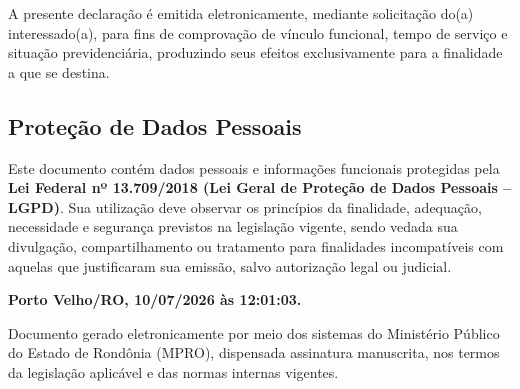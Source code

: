 \documentclass[
]{article}
\begin{document}
A presente declaração é emitida eletronicamente, mediante solicitação
do(a) interessado(a), para fins de comprovação de vínculo funcional,
tempo de serviço e situação previdenciária, produzindo seus efeitos
exclusivamente para a finalidade a que se destina.

\subsection{Proteção de Dados
Pessoais}\label{proteuxe7uxe3o-de-dados-pessoais}

Este documento contém dados pessoais e informações funcionais protegidas
pela \textbf{Lei Federal nº 13.709/2018 (Lei Geral de Proteção de Dados
Pessoais -- LGPD)}. Sua utilização deve observar os princípios da
finalidade, adequação, necessidade e segurança previstos na legislação
vigente, sendo vedada sua divulgação, compartilhamento ou tratamento
para finalidades incompatíveis com aquelas que justificaram sua emissão,
salvo autorização legal ou judicial.

\textbf{Porto Velho/RO, 10/07/2026 às 12:01:03.}

Documento gerado eletronicamente por meio dos sistemas do Ministério
Público do Estado de Rondônia (MPRO), dispensada assinatura manuscrita,
nos termos da legislação aplicável e das normas internas vigentes.
\end{document}
